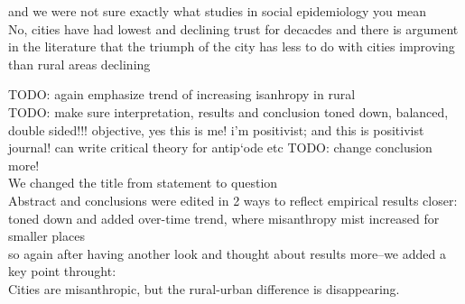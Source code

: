 and we were not sure exactly what studies in social epidemiology you mean\\

No, cities have had lowest and declining trust for decacdes and
there is argument in the literature that the triumph of the city has less to do
with cities improving than rural areas declining \citep{aokCityBook15}\\


TODO: again emphasize trend of increasing isanhropy in rural\\
TODO: make sure interpretation, results and conclusion toned down, balanced,
double sided!!! objective, yes this is me! i'm positivist; and this is
positivist journal! can write critical theory for antip`ode etc
TODO: change conclusion more!\\

We changed the title from statement to question\\

Abstract and conclusions were edited in 2 ways to reflect empirical
results closer: toned down and added over-time trend, where misanthropy mist
increased for smaller places\\

so again after having another look and thought about results more--we added a key point throught:\\

Cities are misanthropic, but the rural-urban difference is disappearing.




\newpage





